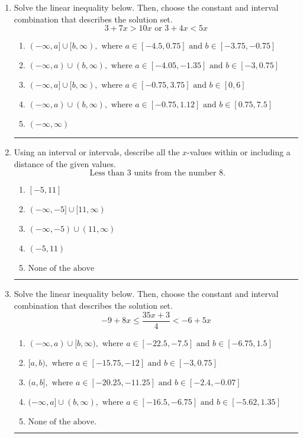 \documentclass[14pt]{extbook}
\newcommand{\litem}[1]{\item#1\hspace*{-1cm}\rule{\textwidth}{0.4pt}}
\begin{document}
\begin{enumerate}
{\begin{enumerate}[label=\Alph*.]
\end{enumerate} }
\litem{
Solve the linear inequality below. Then, choose the constant and interval combination that describes the solution set.\[ 3 + 7 x > 10 x \text{ or } 3 + 4 x < 5 x \]\begin{enumerate}[label=\Alph*.]
\item \( (-\infty, a] \cup [b, \infty), \text{ where } a \in [-4.5, 0.75] \text{ and } b \in [-3.75, -0.75] \)
\item \( (-\infty, a) \cup (b, \infty), \text{ where } a \in [-4.05, -1.35] \text{ and } b \in [-3, 0.75] \)
\item \( (-\infty, a] \cup [b, \infty), \text{ where } a \in [-0.75, 3.75] \text{ and } b \in [0, 6] \)
\item \( (-\infty, a) \cup (b, \infty), \text{ where } a \in [-0.75, 1.12] \text{ and } b \in [0.75, 7.5] \)
\item \( (-\infty, \infty) \)

\end{enumerate} }
\litem{
Using an interval or intervals, describe all the $x$-values within or including a distance of the given values.\[ \text{ Less than } 3 \text{ units from the number } 8. \]\begin{enumerate}[label=\Alph*.]
\item \( [-5, 11] \)
\item \( (-\infty, -5] \cup [11, \infty) \)
\item \( (-\infty, -5) \cup (11, \infty) \)
\item \( (-5, 11) \)
\item \( \text{None of the above} \)

\end{enumerate} }
\litem{
Solve the linear inequality below. Then, choose the constant and interval combination that describes the solution set.\[ -9 + 8 x \leq \frac{35 x + 3}{4} < -6 + 5 x \]\begin{enumerate}[label=\Alph*.]
\item \( (-\infty, a) \cup [b, \infty), \text{ where } a \in [-22.5, -7.5] \text{ and } b \in [-6.75, 1.5] \)
\item \( [a, b), \text{ where } a \in [-15.75, -12] \text{ and } b \in [-3, 0.75] \)
\item \( (a, b], \text{ where } a \in [-20.25, -11.25] \text{ and } b \in [-2.4, -0.07] \)
\item \( (-\infty, a] \cup (b, \infty), \text{ where } a \in [-16.5, -6.75] \text{ and } b \in [-5.62, 1.35] \)
\item \( \text{None of the above.} \)


\end{enumerate}}
\end{enumerate}
\end{document}
